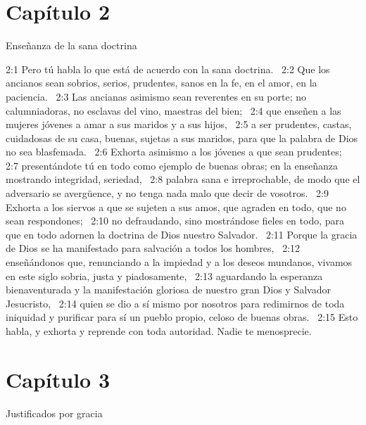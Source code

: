 \section*{Capítulo 2}
Enseñanza de la sana doctrina  

2:1 Pero tú habla lo que está de acuerdo con la sana doctrina.  
2:2 Que los ancianos sean sobrios, serios, prudentes, sanos en la fe, en el amor, en la paciencia.  
2:3 Las ancianas asimismo sean reverentes en su porte; no calumniadoras, no esclavas del vino, maestras del bien;  
2:4 que enseñen a las mujeres jóvenes a amar a sus maridos y a sus hijos,  
2:5 a ser prudentes, castas, cuidadosas de su casa, buenas, sujetas a sus maridos, para que la palabra de Dios no sea blasfemada.  
2:6 Exhorta asimismo a los jóvenes a que sean prudentes;  
2:7 presentándote tú en todo como ejemplo de buenas obras; en la enseñanza mostrando integridad, seriedad,  
2:8 palabra sana e irreprochable, de modo que el adversario se avergüence, y no tenga nada malo que decir de vosotros.  
2:9 Exhorta a los siervos a que se sujeten a sus amos, que agraden en todo, que no sean respondones;  
2:10 no defraudando, sino mostrándose fieles en todo, para que en todo adornen la doctrina de Dios nuestro Salvador.  
2:11 Porque la gracia de Dios se ha manifestado para salvación a todos los hombres,  
2:12 enseñándonos que, renunciando a la impiedad y a los deseos mundanos, vivamos en este siglo sobria, justa y piadosamente,  
2:13 aguardando la esperanza bienaventurada y la manifestación gloriosa de nuestro gran Dios y Salvador Jesucristo,  
2:14 quien se dio a sí mismo por nosotros para redimirnos de toda iniquidad y purificar para sí un pueblo propio, celoso de buenas obras.  
2:15 Esto habla, y exhorta y reprende con toda autoridad. Nadie te menosprecie.  
\section*{Capítulo 3}
Justificados por gracia  

